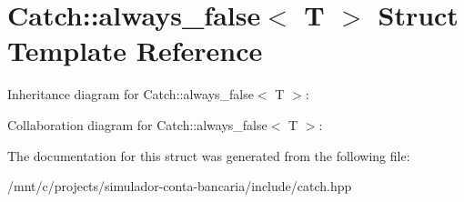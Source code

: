 \hypertarget{structCatch_1_1always__false}{}\section{Catch\+:\+:always\+\_\+false$<$ T $>$ Struct Template Reference}
\label{structCatch_1_1always__false}


Inheritance diagram for Catch\+:\+:always\+\_\+false$<$ T $>$\+:


Collaboration diagram for Catch\+:\+:always\+\_\+false$<$ T $>$\+:


The documentation for this struct was generated from the following file\+:\begin{DoxyCompactItemize}
\item 
/mnt/c/projects/simulador-\/conta-\/bancaria/include/catch.\+hpp\end{DoxyCompactItemize}
